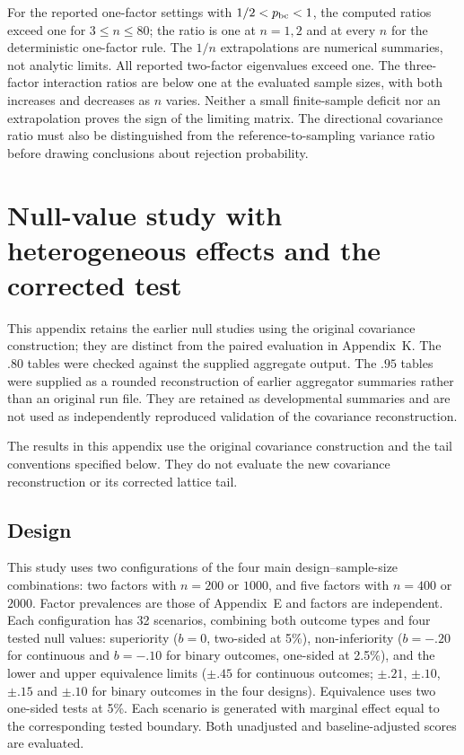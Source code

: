 \documentclass[12pt,a4paper]{article}
\theoremstyle{definition}
\theoremstyle{remark}\newtheorem{remark}{Remark}
\numberwithin{equation}{section}
\begin{document}
For the reported one-factor settings with $1/2<p_{\rm bc}<1$, the computed ratios exceed one for $3\le n\le80$; the ratio is one at $n=1,2$ and at every $n$ for the deterministic one-factor rule. The $1/n$ extrapolations are numerical summaries, not analytic limits. All reported two-factor eigenvalues exceed one. The three-factor interaction ratios are below one at the evaluated sample sizes, with both increases and decreases as $n$ varies. Neither a small finite-sample deficit nor an extrapolation proves the sign of the limiting matrix. The directional covariance ratio must also be distinguished from the reference-to-sampling variance ratio before drawing conclusions about rejection probability.

\section{Null-value study with heterogeneous effects and the corrected test}\label{sec:supp-hetero}
This appendix retains the earlier null studies using the original covariance construction; they are distinct from the paired evaluation in Appendix~K. The $.80$ tables were checked against the supplied aggregate output. The $.95$ tables were supplied as a rounded reconstruction of earlier aggregator summaries rather than an original run file. They are retained as developmental summaries and are not used as independently reproduced validation of the covariance reconstruction.

The results in this appendix use the original covariance construction and the tail conventions specified below. They do not evaluate the new covariance reconstruction or its corrected lattice tail.


\subsection{Design}
This study uses two configurations of the four main design--sample-size combinations: two factors with $n=200$ or $1000$, and five factors with $n=400$ or $2000$. Factor prevalences are those of Appendix~E and factors are independent. Each configuration has 32 scenarios, combining both outcome types and four tested null values: superiority ($b=0$, two-sided at 5\%), non-inferiority ($b=-.20$ for continuous and $b=-.10$ for binary outcomes, one-sided at 2.5\%), and the lower and upper equivalence limits ($\pm.45$ for continuous outcomes; $\pm.21$, $\pm.10$, $\pm.15$ and $\pm.10$ for binary outcomes in the four designs). Equivalence uses two one-sided tests at 5\%. Each scenario is generated with marginal effect equal to the corresponding tested boundary. Both unadjusted and baseline-adjusted scores are evaluated.
\end{document}
